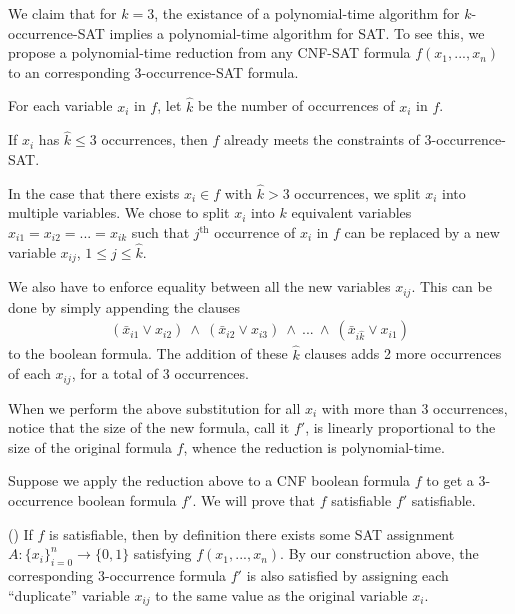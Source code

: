 \documentclass{article}
\begin{document}
\begin{solution} %
We claim that for \( k=3 \), the existance of a polynomial-time algorithm for \( k \)-occurrence-SAT implies a polynomial-time algorithm for SAT. To see this, we propose a polynomial-time reduction from any CNF-SAT formula \( f(x_1, ..., x_n) \) to an corresponding 3-occurrence-SAT formula.

\begin{subproof}[Reduction.]
For each variable \( x_i \) in \( f \), let \( \hat k \) be the number of occurrences of \( x_i \) in \( f \).

If \( x_i \) has \( \hat k \leq 3 \) occurrences, then \( f \) already meets the constraints of 3-occurrence-SAT.

In the case that there exists \( x_i\in f \) with \( \hat k > 3 \) occurrences, we split \( x_i \) into multiple variables.
We chose to split \( x_i \) into \( k \) equivalent variables \( x_{i1} = x_{i2} =  ... = x_{ik} \) such that \( j^{\text{th}} \) occurrence of \( x_i \) in \( f \) can be replaced by a new variable \( x_{ij} \), \( 1 \leq j \leq \hat k \).

We also have to enforce equality between all the new variables \( x_{ij} \).
This can be done by simply appending the clauses
\begin{align*}
    (\bar{x}_{i1} \lor x_{i2}) \ \land \ (\bar{x}_{i2} \lor x_{i3}) \ \land \ ... \ \land \ (\bar{x}_{i\hat k} \lor x_{i1})
\end{align*}
to the boolean formula. The addition of these \( \hat k \) clauses adds 2 more occurrences of each \( x_{ij} \), for a total of 3 occurrences.

When we perform the above substitution for all \( x_i \) with more than 3 occurrences, notice that the size of the new formula, call it \( f' \), is linearly proportional to the size of the original formula \( f \), whence the reduction is polynomial-time.
\end{subproof}



\begin{subproof}[Correctness.]
Suppose we apply the reduction above to a CNF boolean formula \( f \) to get a 3-occurrence boolean formula \( f' \). We will prove that \( f \) satisfiable \iff \( f' \) satisfiable.

(\imp) If \( f \) is satisfiable, then by definition there exists some SAT assignment \( A: \{x_i\}_{i=0}^n \rightarrow \{0,1\} \) satisfying \( f(x_1,..., x_n) \). By our construction above, the corresponding 3-occurrence formula \( f' \) is also satisfied by assigning each ``duplicate'' variable \( x_{ij} \) to the same value as the original variable \( x_i \).


\end{subproof}
\end{solution}
\end{document}
